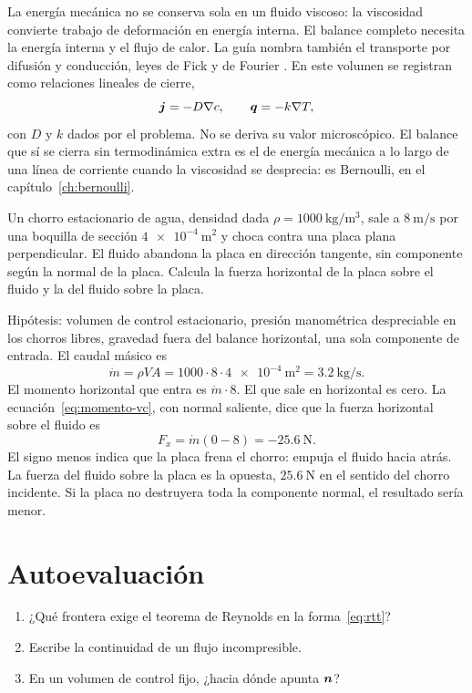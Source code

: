 La energía mecánica no se conserva sola en un fluido viscoso: la viscosidad convierte trabajo de deformación en energía interna. El balance completo necesita la energía interna y el flujo de calor. La guía nombra también el transporte por difusión y conducción, leyes de Fick y de Fourier \parencite{uleGuia2026}. En este volumen se registran como relaciones lineales de cierre,
\begin{equation}
\label{eq:fick-fourier}
\boldsymbol{j}=-D\nabla c,
\qquad
\boldsymbol{q}=-k\nabla T,
\end{equation}
con \(D\) y \(k\) dados por el problema. No se deriva su valor microscópico. El balance que sí se cierra sin termodinámica extra es el de energía mecánica a lo largo de una línea de corriente cuando la viscosidad se desprecia: es Bernoulli, en el capítulo~\ref{ch:bernoulli}.

\begin{problembox}[Intermedio]
Un chorro estacionario de agua, densidad dada \(\rho=\qty{1000}{\kilogram\per\cubic\metre}\), sale a \(\qty{8}{\metre\per\second}\) por una boquilla de sección \(\qty{4e-4}{\square\metre}\) y choca contra una placa plana perpendicular. El fluido abandona la placa en dirección tangente, sin componente según la normal de la placa. Calcula la fuerza horizontal de la placa sobre el fluido y la del fluido sobre la placa.
\end{problembox}
\begin{solutionbox}
Hipótesis: volumen de control estacionario, presión manométrica despreciable en los chorros libres, gravedad fuera del balance horizontal, una sola componente de entrada. El caudal másico es
\[
\dot m=\rho VA=1000\cdot 8\cdot\qty{4e-4}{\square\metre}=\qty{3.2}{\kilogram\per\second}.
\]
El momento horizontal que entra es \(\dot m\cdot 8\). El que sale en horizontal es cero. La ecuación~\eqref{eq:momento-vc}, con normal saliente, dice que la fuerza horizontal sobre el fluido es
\[
F_x=\dot m(0-8)=\qty{-25.6}{\newton}.
\]
El signo menos indica que la placa frena el chorro: empuja el fluido hacia atrás. La fuerza del fluido sobre la placa es la opuesta, \(\qty{25.6}{\newton}\) en el sentido del chorro incidente. Si la placa no destruyera toda la componente normal, el resultado sería menor.
\end{solutionbox}

\section{Autoevaluación}
\begin{enumerate}[leftmargin=1.4em]
\item ¿Qué frontera exige el teorema de Reynolds en la forma~\eqref{eq:rtt}?
\item Escribe la continuidad de un flujo incompresible.
\item En un volumen de control fijo, ¿hacia dónde apunta \(\boldsymbol{n}\)?
\end{enumerate}
